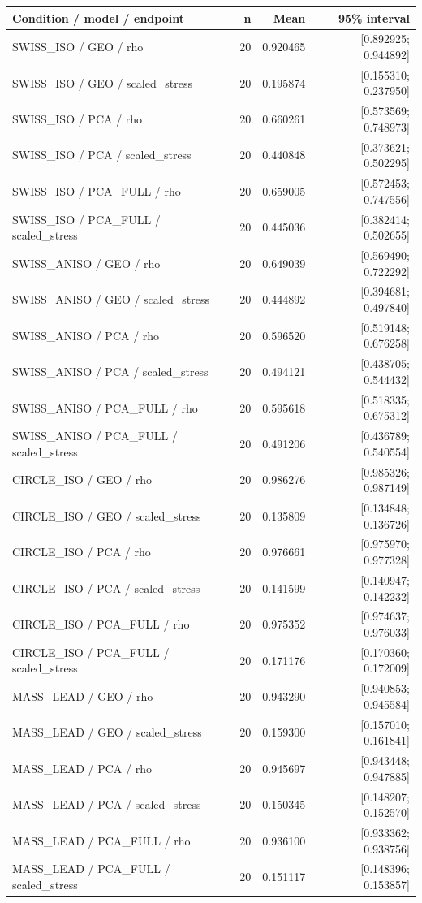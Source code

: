 \begin{longtable}{p{.56\linewidth}rrr}
\toprule Condition / model / endpoint & n & Mean & 95\% interval\\\midrule
SWISS\_ISO / GEO / rho & 20 & 0.920465 & [0.892925; 0.944892] \\
SWISS\_ISO / GEO / scaled\_stress & 20 & 0.195874 & [0.155310; 0.237950] \\
SWISS\_ISO / PCA / rho & 20 & 0.660261 & [0.573569; 0.748973] \\
SWISS\_ISO / PCA / scaled\_stress & 20 & 0.440848 & [0.373621; 0.502295] \\
SWISS\_ISO / PCA\_FULL / rho & 20 & 0.659005 & [0.572453; 0.747556] \\
SWISS\_ISO / PCA\_FULL / scaled\_stress & 20 & 0.445036 & [0.382414; 0.502655] \\
SWISS\_ANISO / GEO / rho & 20 & 0.649039 & [0.569490; 0.722292] \\
SWISS\_ANISO / GEO / scaled\_stress & 20 & 0.444892 & [0.394681; 0.497840] \\
SWISS\_ANISO / PCA / rho & 20 & 0.596520 & [0.519148; 0.676258] \\
SWISS\_ANISO / PCA / scaled\_stress & 20 & 0.494121 & [0.438705; 0.544432] \\
SWISS\_ANISO / PCA\_FULL / rho & 20 & 0.595618 & [0.518335; 0.675312] \\
SWISS\_ANISO / PCA\_FULL / scaled\_stress & 20 & 0.491206 & [0.436789; 0.540554] \\
CIRCLE\_ISO / GEO / rho & 20 & 0.986276 & [0.985326; 0.987149] \\
CIRCLE\_ISO / GEO / scaled\_stress & 20 & 0.135809 & [0.134848; 0.136726] \\
CIRCLE\_ISO / PCA / rho & 20 & 0.976661 & [0.975970; 0.977328] \\
CIRCLE\_ISO / PCA / scaled\_stress & 20 & 0.141599 & [0.140947; 0.142232] \\
CIRCLE\_ISO / PCA\_FULL / rho & 20 & 0.975352 & [0.974637; 0.976033] \\
CIRCLE\_ISO / PCA\_FULL / scaled\_stress & 20 & 0.171176 & [0.170360; 0.172009] \\
MASS\_LEAD / GEO / rho & 20 & 0.943290 & [0.940853; 0.945584] \\
MASS\_LEAD / GEO / scaled\_stress & 20 & 0.159300 & [0.157010; 0.161841] \\
MASS\_LEAD / PCA / rho & 20 & 0.945697 & [0.943448; 0.947885] \\
MASS\_LEAD / PCA / scaled\_stress & 20 & 0.150345 & [0.148207; 0.152570] \\
MASS\_LEAD / PCA\_FULL / rho & 20 & 0.936100 & [0.933362; 0.938756] \\
MASS\_LEAD / PCA\_FULL / scaled\_stress & 20 & 0.151117 & [0.148396; 0.153857] \\
\bottomrule\end{longtable}
